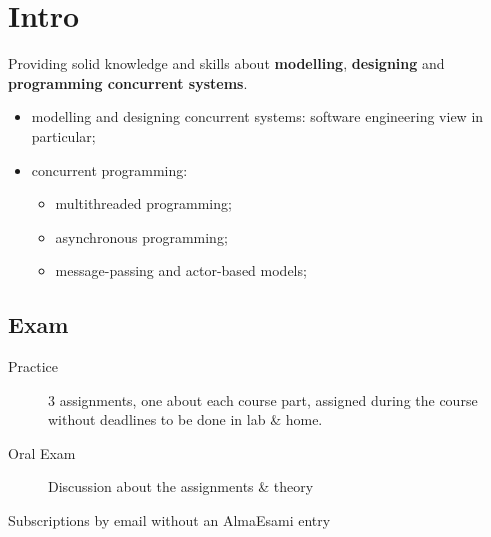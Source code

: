 \chapter{Intro}\label{chap:intro} %
Providing solid knowledge and skills about \textbf{modelling}, \textbf{designing} and \textbf{programming concurrent systems}.
\begin{itemize}
    \item modelling and designing concurrent systems: software engineering view in particular;
    \item concurrent programming:
        \begin{itemize}
            \item multithreaded programming;
            \item asynchronous programming;
            \item message-passing and actor-based models;
        \end{itemize}
\end{itemize}
\section{Exam}\label{sec:exam} %
\begin{description}
    \item[Practice] 3 assignments, one about each course part, assigned during the course without deadlines to be done in lab \& home.
    \item[Oral Exam] Discussion about the assignments \& theory
\end{description}
\begin{note}
    Subscriptions by email without an AlmaEsami entry
\end{note}
